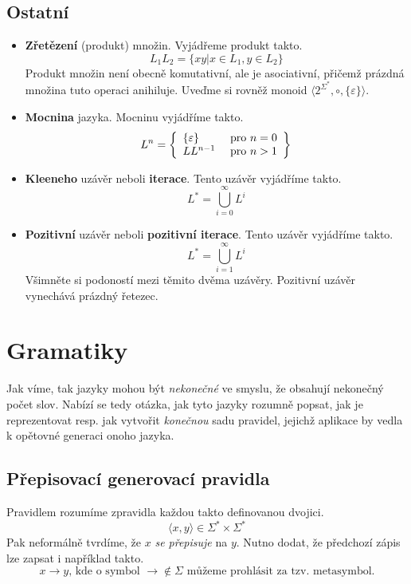 \documentclass[10pt, a4paper, titlepage]{article}
\theoremstyle{note}
\begin{document}
\subsection{Ostatní}
\begin{itemize}
\item
\textbf{Zřetězení} (produkt) množin. Vyjádřeme produkt takto.
$$L_{1}L_{2} = \lbrace xy | x \in L_{1}, y \in L_{2} \rbrace$$
Produkt množin není obecně komutativní, ale je asociativní, přičemž prázdná množina tuto operaci anihiluje.
Uveďme si rovněž monoid $\langle 2^{\Sigma^{*}}, \circ, \lbrace \varepsilon \rbrace \rangle$.

\item
\textbf{Mocnina} jazyka. Mocninu vyjádříme takto.
$$L^{n} = \left\lbrace
\begin{array}{l l}
\lbrace \varepsilon \rbrace & \text{ pro } n = 0 \\
LL^{n-1} & \text{ pro } n > 1 \\
\end{array}
\right\rbrace$$

\item
\textbf{Kleeneho} uzávěr neboli \textbf{iterace}. Tento uzávěr vyjádříme takto.
$$L^{*} = \bigcup_{i = 0}^{\infty} L^{i}$$

\item
\textbf{Pozitivní} uzávěr neboli \textbf{pozitivní iterace}. Tento uzávěr vyjádříme takto.
$$L^{*} = \bigcup_{i = 1}^{\infty} L^{i}$$
Všimněte si podoností mezi těmito dvěma uzávěry. Pozitivní uzávěr vynechává prázdný řetezec.

\end{itemize}

\section{Gramatiky}
Jak víme, tak jazyky mohou být \emph{nekonečné} ve smyslu, že obsahují nekonečný počet slov.
Nabízí se tedy otázka, jak tyto jazyky rozumně popsat, jak je reprezentovat resp. jak vytvořit \emph{konečnou}
sadu pravidel, jejichž aplikace by vedla k opětovné generaci onoho jazyka.

\subsection{Přepisovací generovací pravidla}
Pravidlem rozumíme zpravidla každou takto definovanou dvojici.
$$
\langle x,y \rangle \in \Sigma^{*} \times \Sigma^{*}
$$
Pak neformálně tvrdíme, že $x$ \emph{se přepisuje} na $y$.
Nutno dodat, že předchozí zápis lze zapsat i například takto.
$$
x \rightarrow y\text{, kde o symbol } \rightarrow  \notin \Sigma \text{ můžeme prohlásit za tzv. metasymbol.}
$$
\end{document}
